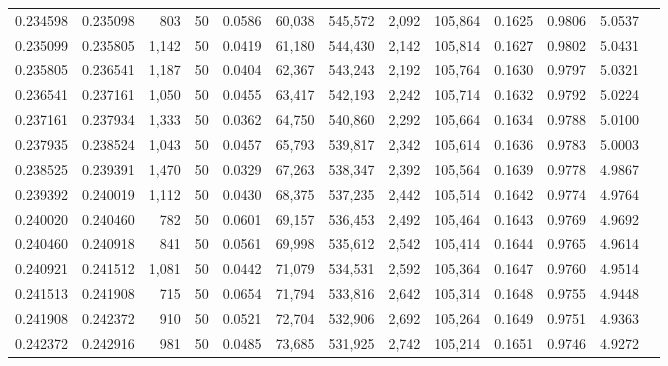 \begin{tabular}{rrrrrrrrrrrrr}
0.234598 & 0.235098 &   803 &  50 &                                     0.0586 &  60,038 & 545,572 &   2,092 & 105,864 & 0.1625 & 0.9806 & 5.0537 \\
0.235099 & 0.235805 & 1,142 &  50 &                                     0.0419 &  61,180 & 544,430 &   2,142 & 105,814 & 0.1627 & 0.9802 & 5.0431 \\
0.235805 & 0.236541 & 1,187 &  50 &                                     0.0404 &  62,367 & 543,243 &   2,192 & 105,764 & 0.1630 & 0.9797 & 5.0321 \\
0.236541 & 0.237161 & 1,050 &  50 &                                     0.0455 &  63,417 & 542,193 &   2,242 & 105,714 & 0.1632 & 0.9792 & 5.0224 \\
0.237161 & 0.237934 & 1,333 &  50 &                                     0.0362 &  64,750 & 540,860 &   2,292 & 105,664 & 0.1634 & 0.9788 & 5.0100 \\
0.237935 & 0.238524 & 1,043 &  50 &                                     0.0457 &  65,793 & 539,817 &   2,342 & 105,614 & 0.1636 & 0.9783 & 5.0003 \\
0.238525 & 0.239391 & 1,470 &  50 &                                     0.0329 &  67,263 & 538,347 &   2,392 & 105,564 & 0.1639 & 0.9778 & 4.9867 \\
0.239392 & 0.240019 & 1,112 &  50 &                                     0.0430 &  68,375 & 537,235 &   2,442 & 105,514 & 0.1642 & 0.9774 & 4.9764 \\
0.240020 & 0.240460 &   782 &  50 &                                     0.0601 &  69,157 & 536,453 &   2,492 & 105,464 & 0.1643 & 0.9769 & 4.9692 \\
0.240460 & 0.240918 &   841 &  50 &                                     0.0561 &  69,998 & 535,612 &   2,542 & 105,414 & 0.1644 & 0.9765 & 4.9614 \\
0.240921 & 0.241512 & 1,081 &  50 &                                     0.0442 &  71,079 & 534,531 &   2,592 & 105,364 & 0.1647 & 0.9760 & 4.9514 \\
0.241513 & 0.241908 &   715 &  50 &                                     0.0654 &  71,794 & 533,816 &   2,642 & 105,314 & 0.1648 & 0.9755 & 4.9448 \\
0.241908 & 0.242372 &   910 &  50 &                                     0.0521 &  72,704 & 532,906 &   2,692 & 105,264 & 0.1649 & 0.9751 & 4.9363 \\
0.242372 & 0.242916 &   981 &  50 &                                     0.0485 &  73,685 & 531,925 &   2,742 & 105,214 & 0.1651 & 0.9746 & 4.9272 \\

\end{tabular}

